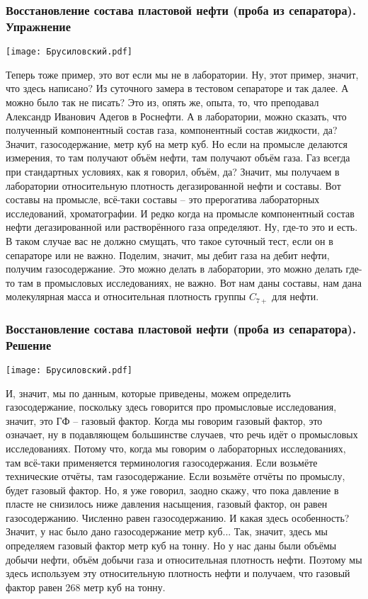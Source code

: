 \documentclass[main.tex]{subfiles}
\begin{document}
\subsubsection{Восстановление состава пластовой нефти (проба из сепаратора). Упражнение}

\begin{center}
\texttt{[image: Брусиловский.pdf]}
\end{center}

Теперь тоже пример, это вот если мы не в лаборатории.
Ну, этот пример, значит, что здесь написано?
Из суточного замера в тестовом сепараторе и так далее.
А можно было так не писать?
Это из, опять же, опыта, то, что преподавал Александр Иванович Адегов в Роснефти.
А в лаборатории, можно сказать, что полученный компонентный состав газа, компонентный состав жидкости, да?
Значит, газосодержание, метр куб на метр куб.
Но если на промысле делаются измерения, то там получают объём нефти, там получают объём газа.
Газ всегда при стандартных условиях, как я говорил, объём, да?
Значит, мы получаем в лаборатории относительную плотность дегазированной нефти и составы.
Вот составы на промысле, всё-таки составы -- это прерогатива лабораторных исследований, хроматографии.
И редко когда на промысле компонентный состав нефти дегазированной или растворённого газа определяют.
Ну, где-то это и есть.
В таком случае вас не должно смущать, что такое суточный тест, если он в сепараторе или не важно.
Поделим, значит, мы дебит газа на дебит нефти, получим газосодержание.
Это можно делать в лаборатории, это можно делать где-то там в промысловых исследованиях, не важно.
Вот нам даны составы, нам дана молекулярная масса и относительная плотность группы $C_{7+}$ для нефти.

\subsubsection{Восстановление состава пластовой нефти (проба из сепаратора). Решение}

\begin{center}
\texttt{[image: Брусиловский.pdf]}
\end{center}

И, значит, мы по данным, которые приведены, можем определить газосодержание, поскольку здесь говорится про промысловые исследования, значит, это ГФ -- газовый фактор.
Когда мы говорим газовый фактор, это означает, ну в подавляющем большинстве случаев, что речь идёт о промысловых исследованиях.
Потому что, когда мы говорим о лабораторных исследованиях, там всё-таки применяется терминология газосодержания.
Если возьмёте технические отчёты, там газосодержание.
Если возьмёте отчёты по промыслу, будет газовый фактор.
Но, я уже говорил, заодно скажу, что пока давление в пласте не снизилось ниже давления насыщения, газовый фактор, он равен газосодержанию.
Численно равен газосодержанию.
И какая здесь особенность?
Значит, у нас было дано газосодержание метр куб...
Так, значит, здесь мы определяем газовый фактор метр куб на тонну.
Но у нас даны были объёмы добычи нефти, объём добычи газа и относительная плотность нефти.
Поэтому мы здесь используем эту относительную плотность нефти и получаем, что газовый фактор равен 268 метр куб на тонну.
\end{document}
